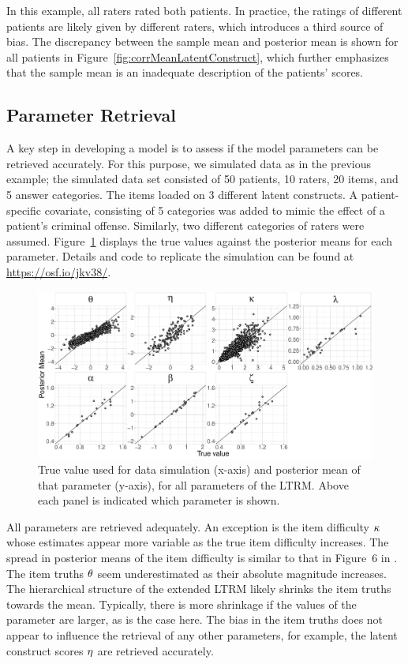 \documentclass[a4paper,usenames,dvipsnames]{article}
\newcommand{\osflink}{\url{https://osf.io/jkv38/}}
\begin{document}
In this example, all raters rated both patients. In practice, the ratings of different patients are likely given by different raters, which introduces a third source of bias. The discrepancy between the sample mean and posterior mean is shown for all patients in Figure~\ref{fig:corrMeanLatentConstruct}, which further emphasizes that the sample mean is an inadequate description of the patients' scores.

\subsection*{Parameter Retrieval}
A key step in developing a model is to assess if the model parameters can be retrieved accurately. For this purpose, we simulated data as in the previous example; the simulated data set consisted of 50 patients, 10 raters, 20 items, and 5 answer categories. The items loaded on 3 different latent constructs. A patient-specific covariate, consisting of 5 categories was added to mimic the effect of a patient's criminal offense. Similarly, two different categories of raters were assumed. Figure~\ref{fig:parameterRecoveryELTRM} displays the true values against the posterior means for each parameter. Details and code to replicate the simulation can be found at \osflink{}.
\begin{figure}[!ht]
	\centering
	\includegraphics[width= \textwidth]{figures/parameterRecoveryModel2.pdf}
	\caption{True value used for data simulation (x-axis) and posterior mean of that parameter (y-axis), for all parameters of the LTRM. Above each panel is indicated which parameter is shown.}
	\label{fig:parameterRecoveryELTRM}
\end{figure}

All parameters are retrieved adequately. An exception is the item difficulty $\kappa$ whose estimates appear more variable as the true item difficulty increases. The spread in posterior means of the item difficulty is similar to that in Figure~6 in \AB{}. The item truths $\theta$ seem underestimated as their absolute magnitude increases. The hierarchical structure of the extended LTRM likely shrinks the item truths towards the mean. Typically, there is more shrinkage if the values of the parameter are larger, as is the case here. The bias in the item truths does not appear to influence the retrieval of any other parameters, for example, the latent construct scores $\eta$ are retrieved accurately. 
\end{document}
